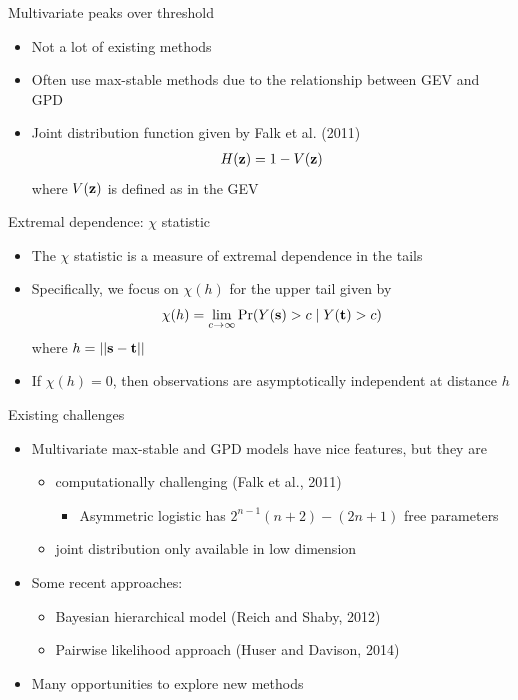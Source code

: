 \documentclass{beamer}
\begin{document}
\begin{frame}{Multivariate peaks over threshold}
  \begin{itemize}
    \item Not a lot of existing methods
    \item Often use max-stable methods due to the relationship between GEV and GPD
    \item Joint distribution function given by Falk et al. (2011)
    \begin{align*}
      H(\mbox{\bf z}) = 1 - V(\mbox{\bf z})
    \end{align*}
    where $V(\mbox{\bf z})$ is defined as in the GEV
  \end{itemize}
\end{frame}

\begin{frame}{Extremal dependence: $\chi$ statistic}
  \begin{itemize} \setlength{\itemsep}{0.5em}
   \item The $\chi$ statistic is a measure of extremal dependence in the tails
   \item Specifically, we focus on $\chi(h)$ for the upper tail given by
    \begin{align*}
      \chi(h) = \lim_{c \rightarrow \infty}\Pr(Y(\mbox{\bf s}) > c \mid Y(\mbox{\bf t}) > c)
    \end{align*}
    where $h = ||\mbox{\bf s} - \mbox{\bf t}||$
    \item If $ \chi(h) = 0$, then observations are asymptotically independent at distance $h$
  \end{itemize}
\end{frame}

\begin{frame}{Existing challenges}
  \begin{itemize} \setlength{\itemsep}{0.5em}
    \item Multivariate max-stable and GPD models have nice features, but they are
    \begin{itemize}
      \item computationally challenging (Falk et al., 2011)
      \begin{itemize}
        \item Asymmetric logistic has $2^{n-1}(n + 2) - (2n + 1)$ free parameters
      \end{itemize}
      \item joint distribution only available in low dimension
    \end{itemize}
    \item Some recent approaches:
    \begin{itemize}
      \item Bayesian hierarchical model (Reich and Shaby, 2012)
      \item Pairwise likelihood approach (Huser and Davison, 2014)
    \end{itemize}
    \item Many opportunities to explore new methods
  \end{itemize}
\end{frame}
\end{document}

